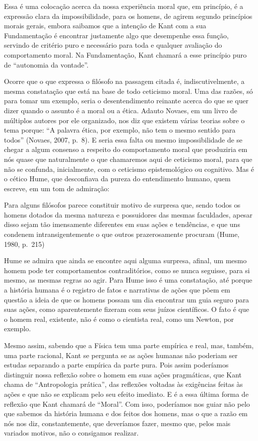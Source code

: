 \documentclass[
  paper=a4,
  twoside  ,captions=tableheading
]{scrbook}
\renewenvironment{quote}{\begin{customblockquote}\list{}{\rightmargin=0em\leftmargin=0em}%
\item\relax\color{blockquote-text}\ignorespaces}{\unskip\unskip\endlist\end{customblockquote}}
\begin{document}
Essa é uma colocação acerca da nossa experiência moral que, em
princípio, é a expressão clara da impossibilidade, para os homens, de
agirem segundo princípios morais gerais, embora saibamos que a intenção
de Kant com a sua Fundamentação é encontrar justamente algo que
desempenhe essa função, servindo de critério puro e necessário para toda
e qualquer avaliação do comportamento moral. Na Fundamentação, Kant
chamará a esse princípio puro de ``autonomia da vontade''.

Ocorre que o que expressa o filósofo na passagem citada é,
indiscutivelmente, a mesma constatação que está na base de todo
ceticismo moral. Uma das razões, só para tomar um exemplo, seria o
desentendimento reinante acerca do que se quer dizer quando o assunto é
a moral ou a ética. Adauto Novaes, em um livro de múltiplos autores por
ele organizado, nos diz que existem várias teorias sobre o tema porque:
``A palavra ética, por exemplo, não tem o mesmo sentido para todos''
(Novaes, 2007, p.~8). E seria essa falta ou mesmo impossibilidade de se
chegar a algum consenso a respeito do comportamento moral que produziria
em nós quase que naturalmente o que chamaremos aqui de ceticismo moral,
para que não se confunda, inicialmente, com o ceticismo epistemológico
ou cognitivo. Mas é o cético Hume, que desconfiava da pureza do
entendimento humano, quem escreve, em um tom de admiração:

\begin{quote}
Para alguns filósofos parece constituir motivo de surpresa que, sendo
todos os homens dotados da mesma natureza e possuidores das mesmas
faculdades, apesar disso sejam tão imensamente diferentes em suas ações
e tendências, e que uns condenem intransigentemente o que outros
prazerosamente procuram (Hume, 1980, p.~215)
\end{quote}

Hume se admira que ainda se encontre aqui alguma surpresa, afinal, um
mesmo homem pode ter comportamentos contraditórios, como se nunca
seguisse, para si mesmo, as mesmas regras ao agir. Para Hume isso é uma
constatação, até porque a história humana é o registro de fatos e
narrativas de ações que põem em questão a ideia de que os homens possam
um dia encontrar um guia seguro para suas ações, como aparentemente
fizeram com seus juízos científicos. O fato é que o homem real,
existente, não é como o cientista real, como um Newton, por exemplo.

Mesmo assim, sabendo que a Física tem uma parte empírica e real, mas,
também, uma parte racional, Kant se pergunta se as ações humanas não
poderiam ser estudas separando a parte empírica da parte pura. Pois
assim poderíamos distinguir nossa reflexão sobre o homem em suas ações
pragmáticas, que Kant chama de ``Antropologia prática'', das reflexões
voltadas às exigências feitas às ações e que não se explicam pelo seu
efeito imediato. E é a essa última forma de reflexão que Kant chamará de
``Moral''. Com isso, poderíamos nos guiar não pelo que sabemos da
história humana e dos feitos dos homens, mas o que a razão em nós nos
diz, constantemente, que deveríamos fazer, mesmo que, pelos mais
variados motivos, não o consigamos realizar.
\end{document}

